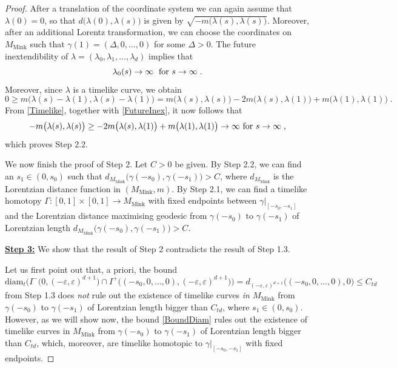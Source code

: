 \documentclass[reqno]{article}
\newcommand{\ed}{(-\varepsilon, \varepsilon)^{d+1}}
\newcommand{\diam}{\mathrm{diam}}
\newcommand{\Mmink}{M_{\mathrm{Mink}}}
\begin{document}
\begin{proof}
After a translation of the coordinate system we can again assume that $\lambda(0) = 0$, so that $d\big(\lambda(0), \lambda(s)\big)$ is given by $\sqrt{- m\big(\lambda(s), \lambda(s)\big)}$. Moreover, after an additional Lorentz transformation, we can choose the coordinates on $\Mmink$ such that $\gamma(1) = (\Delta, 0, \ldots, 0)$ for some $\Delta >0$. The future inextendibility of $\lambda = (\lambda_0, \lambda_1, \ldots, \lambda_d)$ implies that
\begin{equation}
\label{FutureInex}
\lambda_0(s) \to \infty \; \textnormal{ for } s \to \infty \;.
\end{equation}
Moreover, since $\lambda$ is a timelike curve, we obtain
\begin{equation}
\label{Timelike}
0 \geq m\big(\lambda(s) - \lambda(1), \lambda(s) - \lambda(1)\big) = m\big(\lambda(s), \lambda(s)\big) - 2 m\big(\lambda(s), \lambda(1)\big) + m\big(\lambda(1), \lambda(1)\big) \;.
\end{equation}
From \eqref{Timelike}, together with \eqref{FutureInex}, it now follows that
\begin{equation*}
-m\big(\lambda(s), \lambda(s)\big) \geq -2 m \big(\lambda(s), \lambda(1)\big) + m\big(\lambda(1), \lambda(1)\big) \to \infty \textnormal{ for } s \to \infty \;,
\end{equation*} 
which proves Step 2.2.
\vspace*{2mm}

We now finish the proof of Step 2. Let $C>0$ be given. By Step 2.2, we can find an $s_1 \in (0, s_0)$ such that $d_{\Mmink}\big(\gamma(-s_0), \gamma(-s_1)\big) > C$, where $d_{\Mmink}$ is the Lorentzian distance function in $(\Mmink, m)$. By Step 2.1, we can find a timelike homotopy $\Gamma : [0,1] \times [0,1] \to \Mmink$ with fixed endpoints between $\gamma|_{[-s_0,-s_1]}$ and the Lorentzian distance maximising geodesic from $\gamma(-s_0)$ to $\gamma(-s_1)$ of Lorentzian length $d_{\Mmink}\big(\gamma(-s_0), \gamma(-s_1)\big) > C$. 
\vspace*{2mm}

\underline{\textbf{Step 3:}} We show that the result of Step 2 contradicts the result of Step 1.3.
\vspace*{2mm}

Let us first point out that, a priori, the bound
\begin{equation}
\label{BoundDiam}
\diam_t\Big(I^-\big(0, \ed\big) \cap I^+\big((-s_0, 0, \ldots, 0), \ed\big)\Big) = d_{\ed}\big((-s_0, 0, \ldots, 0), 0\big) \leq C_{td}
\end{equation} 
from Step 1.3 does \emph{not} rule out the existence of timelike curves \emph{in $\Mmink$} from $\gamma(-s_0)$ to $\gamma(-s_1)$ of Lorentzian length bigger than $C_{td}$, where $s_1 \in (0, s_0)$. However, as we will show now, the bound \eqref{BoundDiam} rules out the existence of timelike curves in $\Mmink$ from $\gamma(-s_0)$ to $\gamma(-s_1)$ of Lorentzian length bigger than $C_{td}$, which, moreover, are timelike homotopic to $\gamma|_{[-s_0, -s_1]}$ with fixed endpoints.


\end{proof}
\end{document}
